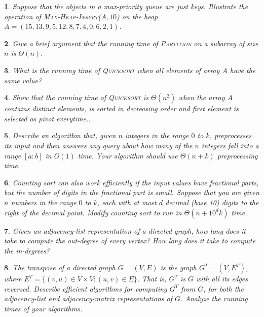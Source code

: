 \documentclass[%
addpoints]{exam}
\theoremstyle{problem}
\newtheorem{p}{}
\begin{document}
\begin{p} 
Suppose that the objects in a max-priority queue are just keys. Illustrate the operation of \textsc{Max-Heap-Insert}(\( A, 10 \)) on the heap \( A = (15, 13, 9, 5, 12, 8, 7, 4, 0, 6, 2, 1) \).  
\hfill  
\end{p}

\begin{p} 
Give a brief argument that the running time of \textsc{Partition} on a subarray of size \( n \) is \( \Theta(n) \).  
\hfill  
\end{p}

\begin{p} 
What is the running time of \textsc{Quicksort} when all elements of array \( A \) have the same value?  
\hfill  
\end{p}

\begin{p} 
Show that the running time of \textsc{Quicksort} is \( \Theta(n^2) \) when the array \( A \) contains distinct elements, is sorted in decreasing order and first element is selected as pivot everytime..  
\hfill  
\end{p}

\begin{p} 
Describe an algorithm that, given \( n \) integers in the range \( 0 \) to \( k \), preprocesses its input and then answers any query about how many of the \( n \) integers fall into a range \([a:b]\) in \( O(1) \) time. Your algorithm should use \( \Theta(n + k) \) preprocessing time.  
\hfill  
\end{p}

\begin{p} 
Counting sort can also work efficiently if the input values have fractional parts, but the number of digits in the fractional part is small. Suppose that you are given \( n \) numbers in the range \( 0 \) to \( k \), each with at most \( d \) decimal (base 10) digits to the right of the decimal point. Modify counting sort to run in \( \Theta(n + 10^d k) \) time.  
\hfill  
\end{p}

\begin{p} 
Given an adjacency-list representation of a directed graph, how long does it take to compute the out-degree of every vertex? How long does it take to compute the in-degrees?  
\hfill  
\end{p}

\begin{p} 
The \textit{transpose} of a directed graph \( G = (V, E) \) is the graph \( G^T = (V, E^T) \), where \( E^T = \{(v, u) \in V \times V : (u, v) \in E\} \). That is, \( G^T \) is \( G \) with all its edges reversed.  
Describe efficient algorithms for computing \( G^T \) from \( G \), for both the adjacency-list and adjacency-matrix representations of \( G \). Analyze the running times of your algorithms.  
\hfill  
\end{p}
\end{document}
